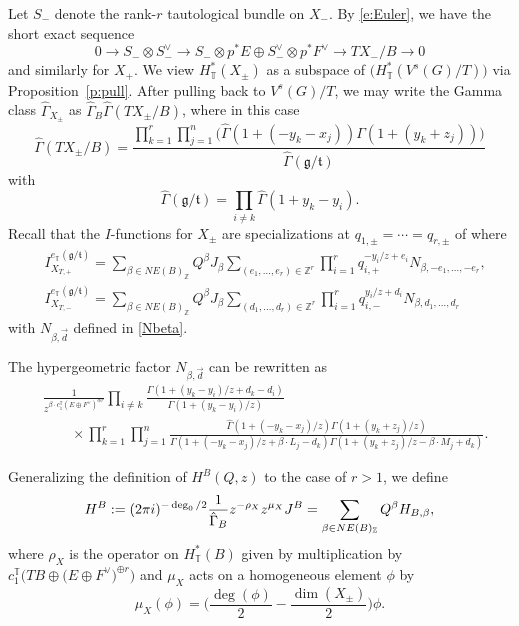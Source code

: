 \documentclass[11pt]{article}
\numberwithin{equation}{section}
\numberwithin{equation}{section}
\newcommand{\ZZ}{\mathbb{Z}}
\newcommand{\torus}{\mathbb{T}}
\newcommand{\F}{F}
\newcommand{\E}{E}
\newcommand{\MB}{M}
\newcommand{\LB}{L}
\newcommand{\z}{z}
\newcommand{\x}{x}
\newcommand{\y}{y}
\begin{document}
Let $S_-$ denote the rank-$r$ tautological bundle on $X_-$. By \eqref{e:Euler}, we have the short exact sequence
\[0 \to S_- \otimes S_-^\vee \to S_- \otimes p^*E \oplus S_-^\vee \otimes p^*F^\vee \to TX_-/B \to 0
\]
and similarly for $X_+$. We view $H^*_\torus(X_\pm)$ as a subspace of $\bigl(H^*_\torus( V^{s}(G)/T)\bigr)$ via Proposition~\ref{p:pull}. After pulling back to $V^s(G)/T$, we may
 write the Gamma class $\hat \Gamma_{X_\pm}$ as
$\hat \Gamma_{B} \hat \Gamma(TX_\pm/B)$, where in this case
\[
\hat \Gamma(TX_\pm/B) = \frac{\prod_{k=1}^r\prod_{j=1}^n\bigl(
\hat \Gamma(1+(- y_k-\x_j))\Gamma(1+(y_k+\z_j))\bigr)}{\hat \Gamma(\mathfrak g/\mathfrak t)}
\]
with
\[
\hat \Gamma(\mathfrak g/\mathfrak t) = \prod_{i \neq k} \hat \Gamma(1 + y_k - y_i).
\]
Recall that the $I$-functions for $X_\pm$ are specializations at $q_{1, \pm} = \cdots = q_{r, \pm}$ of \smash{$I_{X_{T, \pm}}^{e_\torus(\mathfrak g /\mathfrak t)}$} where
\begin{align*}
&I_{X_{T, +}}^{e_\torus(\mathfrak g /\mathfrak t)}=
\sum_{\beta \in NE(B)_\ZZ} Q^\beta J_\beta \sum_{(e_1, \dots, e_r) \in \ZZ^r} \prod_{i=1}^r q_{i, +}^{-\y_i/z+e_i}N_{\beta, -e_1, \dots , -e_r} ,\\
 &I_{X_{T, -}}^{e_\torus(\mathfrak g /\mathfrak t)}=
\sum_{\beta \in NE(B)_\ZZ} Q^\beta J_\beta \sum_{(d_1, \dots, d_r) \in \ZZ^r} \prod_{i=1}^r q_{i, -}^{\y_i/z+d_i}N_{\beta, d_1, \dots , d_r}
\end{align*}
with $N_{\beta,\vec{d}}$ defined in \eqref{Nbeta}.

The hypergeometric factor $N_{\beta,\vec{d}}$ can be rewritten as \begin{align*}
 &\frac{1}{z^{\beta \cdot c_1^\torus(\E \oplus \F^\vee)^{\oplus r}}}\prod_{ i\neq k}\frac{ \Gamma(1 + (\y_k - \y_i)/z + d_k - d_i) }{ \Gamma(1 + (\y_k - \y_i)/z)} \\
 &\qquad{}\times\prod_{k=1}^r\prod_{j=1}^n \frac{
\hat \Gamma(1+(- \y_k-\x_j)/z)\Gamma(1+(\y_k+\z_j)/z)}{\Gamma(1+(-\y_k-\x_j)/z+\beta\cdot \LB_j - d_k)\Gamma(1+(\y_k+\z_j)/z-\beta\cdot \MB_j + d_k)}.
\end{align*}

Generalizing the definition of $H^B(Q ,z)$ to the case of $r>1$, we define
\begin{align*} H^B := (2 \pi {\rm i})^{-\deg_0/2}\frac{1}{\hat \Gamma_B} z^{- \rho_{X}} z^{\mu_{X}} J^B
 =
\sum_{\beta \in NE(B)_\ZZ} Q^\beta H_{B, \beta},\end{align*}
where $\rho_{X}$ is the operator on $H^*_\torus(B)$ given by multiplication by $c_1^\torus\bigl(TB \oplus \bigl(E \oplus F^\vee\bigr)^{\oplus r}\bigr)$ and $\mu_X$ acts on a homogeneous element $\phi$ by
\[
\mu_{X}(\phi) = \biggl( \frac{\deg(\phi)}{2} -\frac{ \dim(X_{\pm})}{2} \biggr) \phi.
\]
\end{document}

